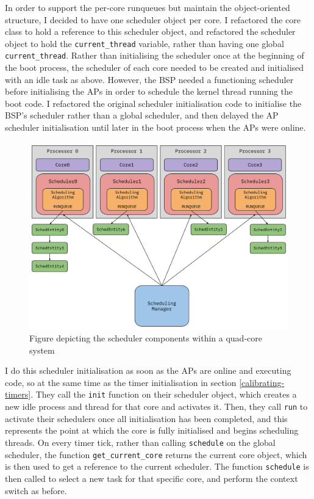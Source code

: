 \documentclass[bsc,frontabs,singlespacing,parskip,deptreport]{infthesis}
\begin{document}
In order to support the per-core runqueues but maintain the object-oriented structure, I decided to have one scheduler object per core. I refactored the core class to hold a reference to this scheduler object, and refactored the scheduler object to hold the \verb|current_thread| variable, rather than having one global \verb|current_thread|. Rather than initialising the scheduler once at the beginning of the boot process, the scheduler of each core needed to be created and initialised with an idle task as above. However, the BSP needed a functioning scheduler before initialising the APs in order to schedule the kernel thread running the boot code. I refactored the original scheduler initialisation code to initialise the BSP's scheduler rather than a global scheduler, and then delayed the AP scheduler initialisation until later in the boot process when the APs were online.

\begin{figure}[t!]
    \centering
    \includegraphics[width=\textwidth]{figures/multicore-schedulers.pdf}
    \caption{Figure depicting the scheduler components within a quad-core system}
    \label{multicore-schedulers}
\end{figure}

I do this scheduler initialisation as soon as the APs are online and executing code, so at the same time as the timer initialisation in section \ref{calibrating-timers}. They call the \verb|init| function on their scheduler object, which creates a new idle process and thread for that core and activates it. Then, they call \verb|run| to activate their schedulers once all initialisation has been completed, and this represents the point at which the core is fully initialised and begins scheduling threads. On every timer tick, rather than calling \verb|schedule| on the global scheduler, the function \verb|get_current_core| returns the current core object, which is then used to get a reference to the current scheduler. The function \verb|schedule| is then called to select a new task for that specific core, and perform the context switch as before.
\end{document}
